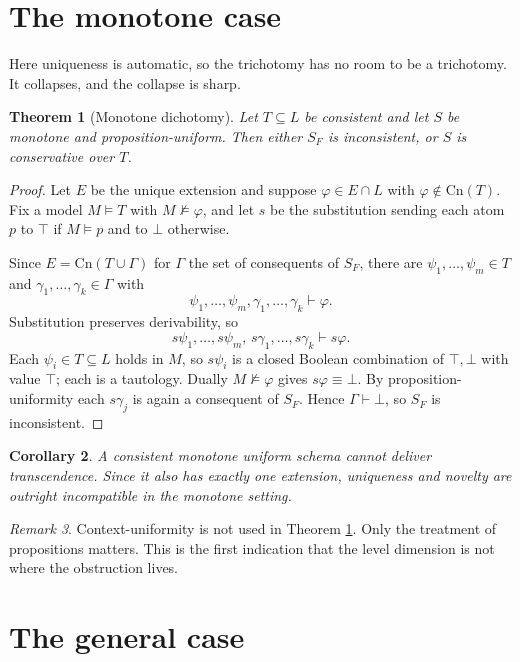 \documentclass[11pt]{article}
\theoremstyle{plain}
\newtheorem{theorem}{Theorem}
\newtheorem{corollary}[theorem]{Corollary}
\theoremstyle{definition}
\theoremstyle{remark}
\newtheorem{remark}[theorem]{Remark}
\newcommand{\Cn}{\mathrm{Cn}}
\begin{document}
\section{The monotone case}

Here uniqueness is automatic, so the trichotomy has no room to be a trichotomy.
It collapses, and the collapse is sharp.

\begin{theorem}[Monotone dichotomy]\label{thm:mono}
Let $T \subseteq L$ be consistent and let $S$ be monotone and
proposition-uniform. Then either $S_F$ is inconsistent, or $S$ is conservative
over $T$.
\end{theorem}

\begin{proof}
Let $E$ be the unique extension and suppose $\varphi \in E \cap L$ with
$\varphi \notin \Cn(T)$. Fix a model $M \models T$ with $M \not\models \varphi$,
and let $s$ be the substitution sending each atom $p$ to $\top$ if $M \models p$
and to $\bot$ otherwise.

Since $E = \Cn(T \cup \Gamma)$ for $\Gamma$ the set of consequents of $S_F$,
there are $\psi_1,\dots,\psi_m \in T$ and $\gamma_1,\dots,\gamma_k \in \Gamma$
with
\[
\psi_1,\dots,\psi_m,\gamma_1,\dots,\gamma_k \vdash \varphi .
\]
Substitution preserves derivability, so
\[
s\psi_1,\dots,s\psi_m,\,s\gamma_1,\dots,s\gamma_k \vdash s\varphi .
\]
Each $\psi_i \in T \subseteq L$ holds in $M$, so $s\psi_i$ is a closed Boolean
combination of $\top,\bot$ with value $\top$; each is a tautology. Dually
$M \not\models \varphi$ gives $s\varphi \equiv \bot$. By proposition-uniformity
each $s\gamma_j$ is again a consequent of $S_F$. Hence
$\Gamma \vdash \bot$, so $S_F$ is inconsistent.
\end{proof}

\begin{corollary}\label{cor:mono}
A consistent monotone uniform schema cannot deliver transcendence. Since it also
has exactly one extension, uniqueness and novelty are outright incompatible in
the monotone setting.
\end{corollary}

\begin{remark}
Context-uniformity is not used in Theorem \ref{thm:mono}. Only the treatment of
propositions matters. This is the first indication that the level dimension is
not where the obstruction lives.
\end{remark}

\section{The general case}
\end{document}
